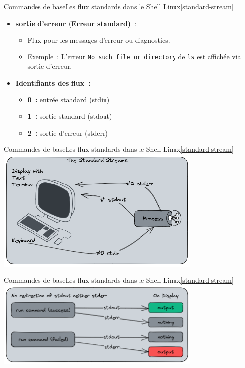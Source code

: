 \documentclass{beamer}
\begin{document}
    \begin{frame}{Commandes de base}{Les flux standards dans le Shell Linux\cref{standard-stream}}
        \begin{itemize}
            \item \textbf{sortie d'erreur (Erreur standard)}~:
            \begin{itemize}
                \item Flux pour les messages d'erreur ou diagnostics.
                \item Exemple~: L'erreur \lstinline{No such file or directory} de \lstinline{ls} est affichée via sortie d'erreur.
            \end{itemize}
            \item \textbf{Identifiants des flux~:}
            \begin{itemize}
                \item \textbf{0~:} entrée standard (stdin)
                \item \textbf{1~:} sortie standard (stdout)
                \item \textbf{2~:} sortie d'erreur (stderr)
            \end{itemize}
        \end{itemize}
    \end{frame}

    \begin{frame}{Commandes de base}{Les flux standards dans le Shell Linux\cref{standard-stream}}
        \centering
        \includegraphics[width=10cm]{image/standard-stream-computer}
    \end{frame}

    \begin{frame}{Commandes de base}{Les flux standards dans le Shell Linux\cref{standard-stream}}
        \centering
        \includegraphics[width=10cm]{image/shell-stream-no-redirect}
    \end{frame}
\end{document}

